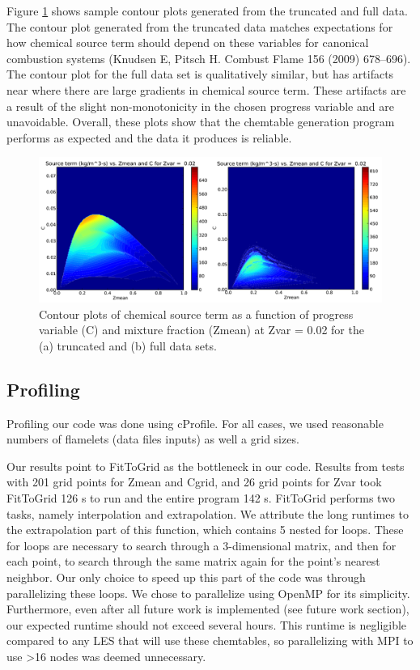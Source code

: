 \documentclass[11pt]{article}
\begin{document}
Figure \ref{fig:ya_yb} shows sample contour plots generated from the
truncated and full data. The contour plot generated from the truncated
data matches expectations for how chemical source term should depend
on these variables for canonical combustion systems (Knudsen E, Pitsch
H. Combust Flame 156 (2009) 678–696). The contour plot for the full
data set is qualitatively similar, but has artifacts near where there
are large gradients in chemical source term. These artifacts are a
result of the slight non-monotonicity in the chosen progress variable
and are unavoidable. Overall, these plots show that the chemtable
generation program performs as expected and the data it produces is
reliable.

\begin{figure} [h]
\centering
\includegraphics[width=\textwidth]{ya_yb.PNG}
\caption{\label{fig:ya_yb} Contour plots of chemical source term as a
  function of progress variable (C) and mixture fraction (Zmean) at
  Zvar = 0.02 for the (a) truncated and (b) full data sets.}
\end{figure}

\subsection{Profiling}
Profiling our code was done using cProfile. For all cases, we used
reasonable numbers of flamelets (data files inputs) as well a grid
sizes.

Our results point to FitToGrid as the bottleneck in our code. Results
from tests with 201 grid points for Zmean and Cgrid, and 26 grid
points for Zvar took FitToGrid 126 s to run and the entire program 142
s. FitToGrid performs two tasks, namely interpolation and
extrapolation. We attribute the long runtimes to the extrapolation
part of this function, which contains 5 nested for loops. These for
loops are necessary to search through a 3-dimensional matrix, and then
for each point, to search through the same matrix again for the
point’s nearest neighbor. Our only choice to speed up this part of the
code was through parallelizing these loops. We chose to parallelize
using OpenMP for its simplicity. Furthermore, even after all future
work is implemented (see future work section), our expected runtime
should not exceed several hours. This runtime is negligible compared
to any LES that will use these chemtables, so parallelizing with MPI
to use >16 nodes was deemed unnecessary.
\end{document}
